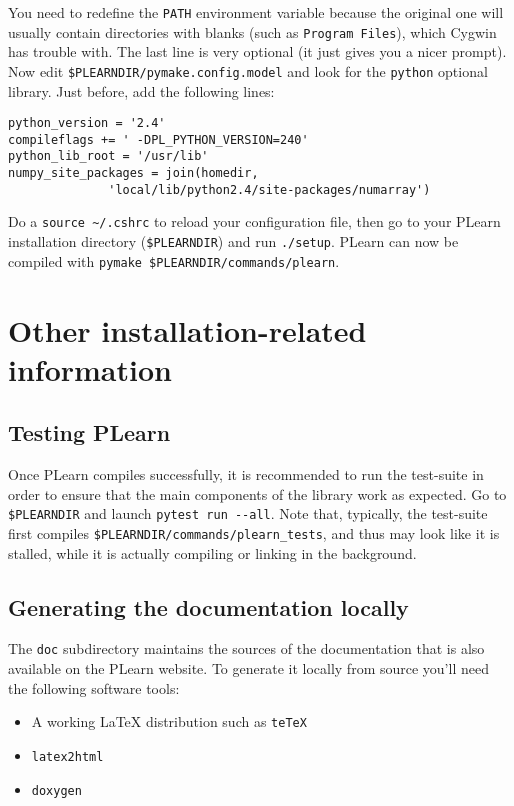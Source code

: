 \documentclass[11pt]{book}
\begin{document}
You need to redefine the \verb!PATH! environment variable because the
original one will usually contain directories with blanks (such as
\verb!Program Files!), which Cygwin has trouble with.
The last line is very optional (it just gives you a nicer prompt).
Now edit \verb!$PLEARNDIR/pymake.config.model! and look for the
\verb!python! optional library.
Just before, add the following lines:
\begin{verbatim}
python_version = '2.4'
compileflags += ' -DPL_PYTHON_VERSION=240'
python_lib_root = '/usr/lib'
numpy_site_packages = join(homedir,
              'local/lib/python2.4/site-packages/numarray')
\end{verbatim}

Do a \verb!source ~/.cshrc! to reload your configuration file, then go
to your PLearn installation directory (\verb!$PLEARNDIR!) and run \verb!./setup!. PLearn can now be compiled
with \verb!pymake $PLEARNDIR/commands/plearn!.



\chapter{Other installation-related information}

\section{Testing PLearn}

Once PLearn compiles successfully, it is recommended to run the test-suite
in order to ensure that the main components of the library work as expected.
Go to \verb!$PLEARNDIR! and launch \verb!pytest run --all!.
Note that, typically, the test-suite first compiles \verb!$PLEARNDIR/commands/plearn_tests!,
and thus may look like it is stalled, while it is actually compiling or linking
in the background.

\section{Generating the documentation locally}

The {\tt doc} subdirectory maintains the sources of the documentation that is also
available on the PLearn website. To generate it locally from source you'll
need the following software tools:
\begin{itemize}
\item A working LaTeX distribution such as {\tt teTeX}
\item {\tt latex2html}
\item {\tt doxygen}
\end{itemize}
\end{document}
